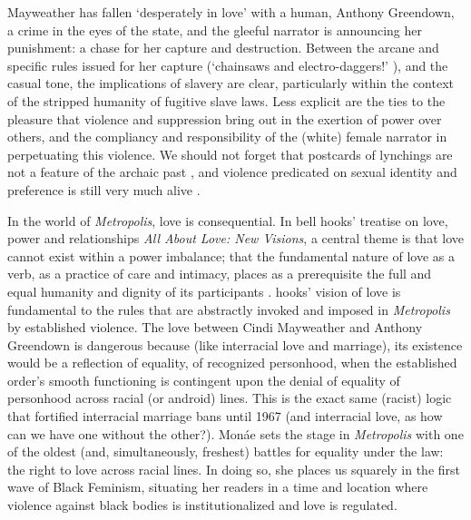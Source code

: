 \documentclass[a4paper, 11pt]{article} %
\begin{document}
Mayweather has fallen `desperately in love' with a human, Anthony Greendown, a crime in the eyes of the state, and the gleeful narrator is announcing her punishment: a chase for her capture and destruction.
Between the arcane and specific rules issued for her capture (`chainsaws and electro-daggers!' \cite{wolfmasters}), and the casual tone, the implications of slavery are clear, particularly within the context of the stripped humanity of fugitive slave laws.
Less explicit are the ties to the pleasure that violence and suppression bring out in the exertion of power over others, and the compliancy and responsibility of the (white) female narrator in perpetuating this violence.
We should not forget that postcards of lynchings are not a feature of the archaic past \cite{lynching}, and violence predicated on sexual identity and preference is still very much alive \cite{wikipediatransmurders}.

In the world of \emph{Metropolis}, love is consequential.
In bell hooks' treatise on love, power and relationships \emph{All About Love: New Visions}, a central theme is that love cannot exist within a power imbalance; that the fundamental nature of love as a verb, as a practice of care and intimacy, places as a prerequisite the full and equal humanity and dignity of its participants \cite{newvisions}. 
hooks' vision of love is fundamental to the rules that are abstractly invoked and imposed in \emph{Metropolis} by established violence. 
The love between Cindi Mayweather  and Anthony Greendown is dangerous because (like interracial love and marriage), its existence would be a reflection of equality, of recognized personhood, when the established order's smooth functioning is contingent upon the denial of equality of personhood across racial (or android) lines. 
This is the exact same (racist) logic that fortified interracial marriage bans until 1967 \cite{wikipediaantimiscegenation} (and interracial love, as how can we have one without the other?).
Mon\'ae sets the stage in \emph{Metropolis} with one of the oldest (and, simultaneously, freshest) battles for equality under the law: the right to love across racial lines.
In doing so, she places us squarely in the first wave of Black Feminism, situating her readers in a time and location where violence against black bodies is institutionalized and love is regulated.
\end{document}
